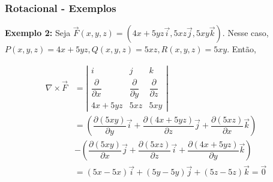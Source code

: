 \begin{frame}
    \frametitle{Rotacional - Exemplos}
    \justifying
    \textbf{Exemplo 2:} Seja $\vec{F}(x,y,z)=(4x+5yz\vec{i}, 5xz\vec{j}, 5xy\vec{k})$. Nesse caso, $P(x,y,z)=4x+5yz, Q(x,y,z)=5xz, R(x,y,z)=5xy$. Então,
    
    \begin{align*}
        \nabla \times \vec{F} & = \left| \begin{array}{ccc}
            i                            & j                            & k                            \\[2mm]
            \dfrac{\partial}{\partial x} & \dfrac{\partial}{\partial y} & \dfrac{\partial}{\partial z} \\[4mm]
            4x+5yz                       & 5xz                          & 5xy
        \end{array}\right|                \\[3mm]
                              & = \left(
        \dfrac{\partial (5xy)}{\partial y}
        \vec{i} +
        \dfrac{\partial (4x+5yz)}{\partial z}
        \vec{j} +
        \dfrac{\partial (5xz)}{\partial x}
        \vec{k}
        \right)
        \\[3mm]
                              & - \left(
        \dfrac{\partial (5xy)}{\partial x}
        \vec{j} +
        \dfrac{\partial (5xz)}{\partial z}
        \vec{i} +
        \dfrac{\partial (4x+5yz)}{\partial y}
        \vec{k}
        \right)
        \\[3mm]
                              & = (5x-5x)\vec{i}+(5y-5y)\vec{j}+(5z-5z)\vec{k} = \vec{0}
    \end{align*}
\end{frame}

